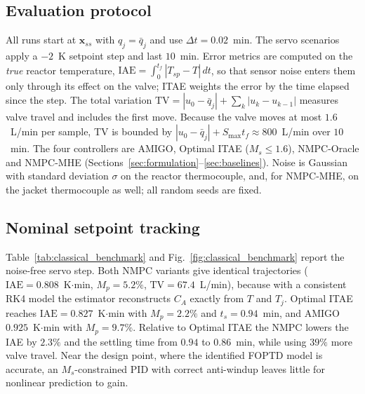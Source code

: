 
\subsection{Evaluation protocol}
\label{subsec:protocol}
All runs start at $\mathbf{x}_{ss}$ with $q_j = \bar q_j$ and use $\Delta t = 0.02$~min. The servo scenarios apply a $-2$~K setpoint step and last $10$~min. Error metrics are computed on the \emph{true} reactor temperature, $\mathrm{IAE} = \int_0^{t_f} |T_{sp} - T|\,dt$, so that sensor noise enters them only through its effect on the valve; ITAE weights the error by the time elapsed since the step. The total variation $\mathrm{TV} = |u_0 - \bar q_j| + \sum_k |u_k - u_{k-1}|$ measures valve travel and includes the first move. Because the valve moves at most $1.6$~L/min per sample, TV is bounded by $|u_0 - \bar q_j| + S_{\max} t_f \approx 800$~L/min over $10$~min. The four controllers are AMIGO, Optimal ITAE ($M_s \le 1.6$), NMPC-Oracle and NMPC-MHE (Sections~\ref{sec:formulation}--\ref{sec:baselines}). Noise is Gaussian with standard deviation $\sigma$ on the reactor thermocouple, and, for NMPC-MHE, on the jacket thermocouple as well; all random seeds are fixed.

\subsection{Nominal setpoint tracking}
\label{subsec:nominal}
Table~\ref{tab:classical_benchmark} and Fig.~\ref{fig:classical_benchmark} report the noise-free servo step. Both NMPC variants give identical trajectories ($\mathrm{IAE} = 0.808$~K$\cdot$min, $M_p = 5.2\%$, $\mathrm{TV} = 67.4$~L/min), because with a consistent RK4 model the estimator reconstructs $C_A$ exactly from $T$ and $T_j$. Optimal ITAE reaches $\mathrm{IAE} = 0.827$~K$\cdot$min with $M_p = 2.2\%$ and $t_s = 0.94$~min, and AMIGO $0.925$~K$\cdot$min with $M_p = 9.7\%$. Relative to Optimal ITAE the NMPC lowers the IAE by $2.3\%$ and the settling time from $0.94$ to $0.86$~min, while using $39\%$ more valve travel. Near the design point, where the identified FOPTD model is accurate, an $M_s$-constrained PID with correct anti-windup leaves little for nonlinear prediction to gain.


